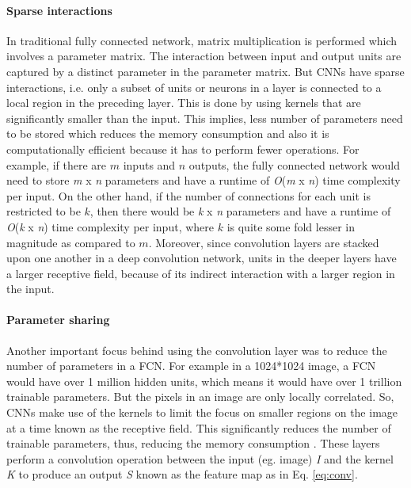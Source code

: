 \paragraph{Sparse interactions}
In traditional fully connected network, matrix multiplication is performed which involves a parameter matrix. The interaction between input and output units are captured by a distinct parameter in the parameter matrix. But \ac{CNN}s have sparse interactions, i.e. only a subset of units or neurons in a layer is connected to a local region in the preceding layer. This is done by using kernels that are significantly smaller than the input. This implies, less number of parameters need to be stored which reduces the memory consumption and also it is computationally efficient because it has to perform fewer operations. For example, if there are $m$ inputs and $n$ outputs, the fully connected network would need to store \textit{m} x \textit{n} parameters and have a runtime of \textit{O}(\textit{m} x \textit{n}) time complexity per input. On the other hand, if the number of connections for each unit is restricted to be $k$, then there would be \textit{k} x \textit{n} parameters and have a runtime of \textit{O}(\textit{k} x \textit{n}) time complexity per input, where $k$ is quite some fold lesser in magnitude as compared to $m$. Moreover, since convolution layers are stacked upon one another in a deep convolution network, units in the deeper layers have a larger receptive field, because of its indirect interaction with a larger region in the input.
\paragraph{Parameter sharing}
Another important focus behind using the convolution layer was to reduce the number of parameters in a \ac{FCN}. For example in a 1024*1024 image, a \ac{FCN} would have over 1 million hidden units, which means it would have over 1 trillion trainable parameters. But the pixels in an image are only locally correlated. So, \ac{CNN}s make use of the kernels to limit the focus on smaller regions on the image at a time known as the receptive field. This significantly reduces the number of trainable parameters, thus, reducing the memory consumption \cite{ConvNet}. These layers perform a convolution operation between the input (eg. image) \textit{I} and the kernel \textit{K} to produce an output \textit{S} known as the feature map as in Eq. \ref{eq:conv}.\cite{Goodfellow-et-al-2016}
